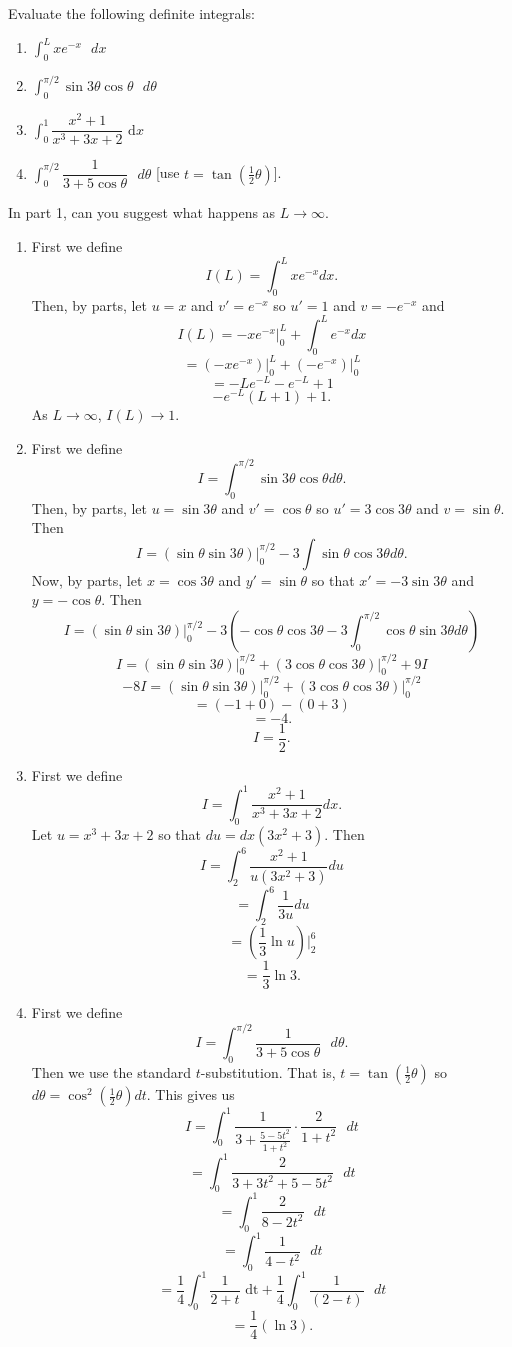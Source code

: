 Evaluate the following definite integrals:
\begin{enumerate}
\item $\int^L_0 xe^{-x} \text{ }dx$
\item $\int^{\pi/2}_0 \sin3\theta \cos\theta \text{ }d\theta$
\item $\int^1_0 \dfrac{x^2+1}{x^3+3x+2}\text{ d}x$
\item $\int^{\pi/2}_0 \dfrac{1}{3+5\cos\theta} \text{ }d\theta$ [use $t = \tan(\frac{1}{2}\theta)$].
\end{enumerate}
In part 1, can you suggest what happens as $L \to \infty$.
\begin{enumerate}
\item
First we define
\[
I(L) = \int^L_0 xe^{-x} dx.
\]
Then, by parts, let $u = x$ and $v' = e^{-x}$ so $u' = 1$ and $v = -e^{-x}$ and
\[
I(L) = -xe^{-x}\rvert^L_0 + \int^L_0 e^{-x} dx 	
\]
\[
= (-xe^{-x})\rvert^L_0 + (-e^{-x})\rvert^L_0
\]
\[
= -Le^{-L} - e^{-L} +1
\]
\[
-e^{-L}(L+1) + 1.
\]
As $L \to \infty$, $I(L) \to 1$.
\item
First we define
\[
I = \int^{\pi/2}_0 \sin3\theta\cos\theta d\theta.
\]
Then, by parts, let $u = \sin 3\theta$ and $v' = \cos\theta$ so $u' = 3\cos3\theta$ and $v = \sin\theta$. Then
\[
I = (\sin\theta\sin3\theta)\rvert^{\pi/2}_0 - 3\int \sin\theta\cos3\theta d\theta.
\]
Now, by parts, let $x = \cos 3\theta$ and $y' = \sin \theta$ so that $x' = -3\sin3\theta$ and $y = -\cos\theta$. Then
\[
I = (\sin\theta\sin3\theta)\rvert^{\pi/2}_0 -3(-\cos\theta\cos3\theta - 3\int^{\pi/2}_0 \cos\theta\sin3\theta d\theta)
\]
\[
I = (\sin\theta\sin3\theta)\rvert^{\pi/2}_0 + (3\cos\theta\cos3\theta)\rvert^{\pi/2}_0 + 9I
\]
\[
-8I = (\sin\theta\sin3\theta)\rvert^{\pi/2}_0 + (3\cos\theta\cos3\theta)\rvert^{\pi/2}_0
\]
\[
= (-1 + 0) - (0 + 3)
\]
\[
= -4.
\]
\[
I = \frac{1}{2}.
\]
\item
First we define
\[
I = \int^1_0 \frac{x^2+1}{x^3+3x+2} dx.
\]
Let $u = x^3 + 3x+ 2$ so that $du = dx(3x^2 + 3)$.
Then 
\[
I = \int^6_2 \frac{x^2+1}{u(3x^2+3)} du 
\]
\[
= \int^6_2 \frac{1}{3u}du
\]
\[
= (\frac{1}{3}\ln u)\rvert^6_2
\]
\[
= \frac{1}{3}\ln3.
\]
\item
First we define
\[
I = \int^{\pi/2}_0 \frac{1}{3+5\cos\theta}\text{ }d\theta.
\]
Then we use the standard $t$-substitution. That is, $t = \tan(\frac{1}{2}\theta)$ so $d\theta = \cos^2(\frac{1}{2}\theta)dt$. This gives us
\[
I = \int^1_0 \frac{1}{3 + \frac{5-5t^2}{1+t^2}}\cdot\frac{2}{1+t^2}\text{ }dt
\]
\[
= \int^1_0 \frac{2}{3+3t^2 + 5 - 5t^2}\text{ }dt
\]
\[
= \int^1_0 \frac{2}{8-2t^2}\text{ }dt
\]
\[
=\int^1_0 \frac{1}{4-t^2}\text{ }dt
\]
\[
=\frac{1}{4}\int^1_0 \frac{1}{2+t}\text{ dt} + \frac{1}{4}\int^1_0 \frac{1}{(2-t)}\text{ }dt
\]
\[
=\frac{1}{4}\left(\ln3\right).
\]
\end{enumerate}